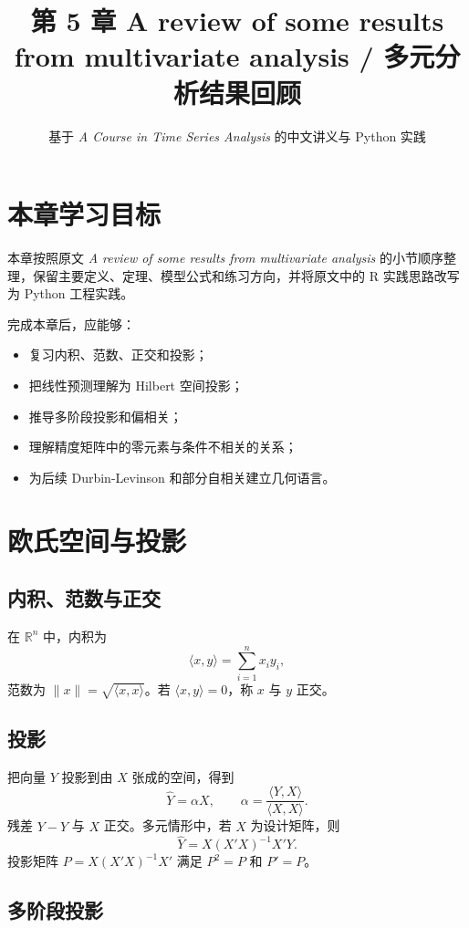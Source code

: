 \documentclass[11pt,a4paper]{ctexart}
\title{第 5 章 \quad A review of some results from multivariate analysis / 多元分析结果回顾}
\author{基于 \textit{A Course in Time Series Analysis} 的中文讲义与 Python 实践}
\date{}
\begin{document}
\maketitle

\section*{本章学习目标}

本章按照原文 \textit{A review of some results from multivariate analysis} 的小节顺序整理，保留主要定义、定理、模型公式和练习方向，并将原文中的 R 实践思路改写为 Python 工程实践。

完成本章后，应能够：
\begin{itemize}
  \item 复习内积、范数、正交和投影；
  \item 把线性预测理解为 Hilbert 空间投影；
  \item 推导多阶段投影和偏相关；
  \item 理解精度矩阵中的零元素与条件不相关的关系；
  \item 为后续 Durbin-Levinson 和部分自相关建立几何语言。
\end{itemize}

\section{欧氏空间与投影}

\subsection{内积、范数与正交}

在 \(\mathbb R^n\) 中，内积为
\[
  \langle x,y\rangle=\sum_{i=1}^n x_i y_i,
\]
范数为 \(\|x\|=\sqrt{\langle x,x\rangle}\)。若 \(\langle x,y\rangle=0\)，称 \(x\) 与 \(y\) 正交。

\subsection{投影}

把向量 \(Y\) 投影到由 \(X\) 张成的空间，得到
\[
  \hat Y=\alpha X,\qquad
  \alpha=\frac{\langle Y,X\rangle}{\langle X,X\rangle}.
\]
残差 \(Y-\hat Y\) 与 \(X\) 正交。多元情形中，若 \(X\) 为设计矩阵，则
\[
  \hat Y=X(X'X)^{-1}X'Y.
\]
投影矩阵 \(P=X(X'X)^{-1}X'\) 满足 \(P^2=P\) 和 \(P'=P\)。

\subsection{多阶段投影}
\end{document}
